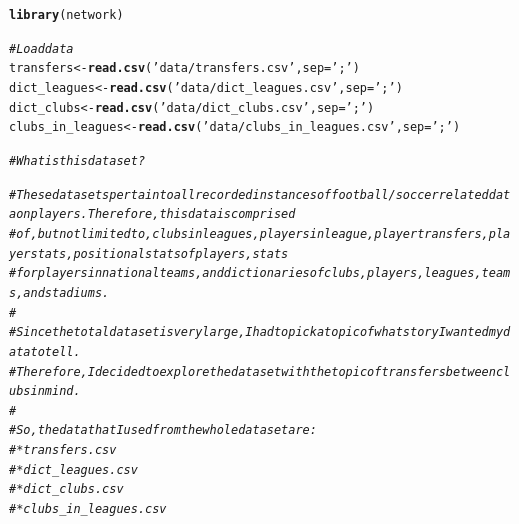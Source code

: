 \documentclass{article}\usepackage[]{graphicx}\usepackage[]{color}
\makeatletter
\newcommand{\hlstr}[1]{\textcolor[rgb]{0.192,0.494,0.8}{#1}}%
\newcommand{\hlcom}[1]{\textcolor[rgb]{0.678,0.584,0.686}{\textit{#1}}}%
\newcommand{\hlstd}[1]{\textcolor[rgb]{0.345,0.345,0.345}{#1}}%
\newcommand{\hlkwb}[1]{\textcolor[rgb]{0.69,0.353,0.396}{#1}}%
\newcommand{\hlkwc}[1]{\textcolor[rgb]{0.333,0.667,0.333}{#1}}%
\newcommand{\hlkwd}[1]{\textcolor[rgb]{0.737,0.353,0.396}{\textbf{#1}}}%
\newenvironment{kframe}{%
 \def\at@end@of@kframe{}%
 \ifinner\ifhmode%
  \def\at@end@of@kframe{\end{minipage}}%
  \begin{minipage}{\columnwidth}%
 \fi\fi%
 \def\FrameCommand##1{\hskip\@totalleftmargin \hskip-\fboxsep
 \colorbox{shadecolor}{##1}\hskip-\fboxsep
     \hskip-\linewidth \hskip-\@totalleftmargin \hskip\columnwidth}%
 \MakeFramed {\advance\hsize-\width
   \@totalleftmargin\z@ \linewidth\hsize
   \@setminipage}}%
 {\par\unskip\endMakeFramed%
 \at@end@of@kframe}
\newenvironment{knitrout}{}{} %
\makeatother
\begin{document}
\begin{knitrout}
\begin{kframe}
{\ttfamily\noindent\itshape\color{messagecolor}{\#\# Registered S3 method overwritten by 'GGally':\\\#\#\ \  method from\ \  \\\#\#\ \  +.gg\ \  ggplot2}}\begin{alltt}
\hlkwd{library}\hlstd{(network)}
\end{alltt}


{\ttfamily\noindent\itshape{}}\begin{alltt}
\hlcom{# Load data}
\hlstd{transfers} \hlkwb{<-} \hlkwd{read.csv}\hlstd{(}\hlstr{'data/transfers.csv'}\hlstd{,} \hlkwc{sep}\hlstd{=}\hlstr{';'}\hlstd{)}
\hlstd{dict_leagues} \hlkwb{<-} \hlkwd{read.csv}\hlstd{(}\hlstr{'data/dict_leagues.csv'}\hlstd{,} \hlkwc{sep}\hlstd{=}\hlstr{';'}\hlstd{)}
\hlstd{dict_clubs} \hlkwb{<-} \hlkwd{read.csv}\hlstd{(}\hlstr{'data/dict_clubs.csv'}\hlstd{,} \hlkwc{sep}\hlstd{=}\hlstr{';'}\hlstd{)}
\hlstd{clubs_in_leagues} \hlkwb{<-} \hlkwd{read.csv}\hlstd{(}\hlstr{'data/clubs_in_leagues.csv'}\hlstd{,} \hlkwc{sep}\hlstd{=}\hlstr{';'}\hlstd{)}


\hlcom{# What is this data set?}

\hlcom{# These data sets pertain to all recorded instances of football/soccer related data on players. Therefore, this data is comprised}
\hlcom{# of, but not limited to, clubs in leagues, players in league, player transfers, player stats, positional stats of players, stats}
\hlcom{# for players in national teams, and dictionaries of clubs, players, leagues, teams, and stadiums.}
\hlcom{# }
\hlcom{# Since the total data set is very large, I had to pick a topic of what story I wanted my data to tell.}
\hlcom{# Therefore, I decided to explore the data set with the topic of transfers between clubs in mind. }
\hlcom{# }
\hlcom{# So, the data that I used from the whole data set are:}
\hlcom{#   * transfers.csv}
\hlcom{#   * dict_leagues.csv}
\hlcom{#   * dict_clubs.csv}
\hlcom{#   * clubs_in_leagues.csv}


\end{alltt}
\end{kframe}
\end{knitrout}
\end{document}
